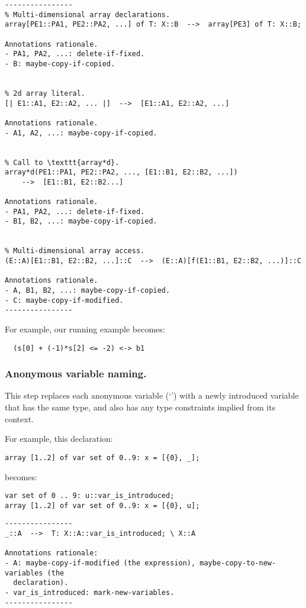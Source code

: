 \documentclass[10pt]{article}
\newcommand{\n}{\symbol{95}}
\begin{document}
\begin{verbatim}
----------------
% Multi-dimensional array declarations.
array[PE1::PA1, PE2::PA2, ...] of T: X::B  -->  array[PE3] of T: X::B;

Annotations rationale.
- PA1, PA2, ...: delete-if-fixed.
- B: maybe-copy-if-copied.


% 2d array literal.
[| E1::A1, E2::A2, ... |]  -->  [E1::A1, E2::A2, ...]

Annotations rationale.
- A1, A2, ...: maybe-copy-if-copied.


% Call to \texttt{array*d}.
array*d(PE1::PA1, PE2::PA2, ..., [E1::B1, E2::B2, ...])
    -->  [E1::B1, E2::B2...]

Annotations rationale.
- PA1, PA2, ...: delete-if-fixed.
- B1, B2, ...: maybe-copy-if-copied.


% Multi-dimensional array access.
(E::A)[E1::B1, E2::B2, ...]::C  -->  (E::A)[f(E1::B1, E2::B2, ...)]::C

Annotations rationale.
- A, B1, B2, ...: maybe-copy-if-copied.
- C: maybe-copy-if-modified.
----------------
\end{verbatim}

For example, our running example becomes:
\begin{verbatim}
  (s[0] + (-1)*s[2] <= -2) <-> b1
\end{verbatim}


\subsubsection{Anonymous variable naming.}
This step replaces each anonymous variable (`\texttt{\n{}}') with
a newly introduced variable that has the same type, and also has any
type constraints implied from its context.

For example, this declaration:
\begin{verbatim}
array [1..2] of var set of 0..9: x = [{0}, _];
\end{verbatim}
becomes:
\begin{verbatim}
var set of 0 .. 9: u::var_is_introduced;
array [1..2] of var set of 0..9: x = [{0}, u];
\end{verbatim}

\begin{verbatim}
----------------
_::A  -->  T: X::A::var_is_introduced; \ X::A

Annotations rationale:
- A: maybe-copy-if-modified (the expression), maybe-copy-to-new-variables (the
  declaration).
- var_is_introduced: mark-new-variables.
----------------
\end{verbatim}
\end{document}
